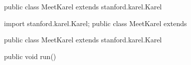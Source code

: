 \begin{sloppypar}
\begin{lstcodesimple}[language = Java, float=hb]
    public class MeetKarel extends stanford.karel.Karel{
            
    }
\end{lstcodesimple}

\begin{lstcodesimple}[language = Java, float]
    import stanford.karel.Karel;
    public class MeetKarel extends {
            
    }
\end{lstcodesimple}

\begin{lstcodesimple}[language = Java, float]
    public class MeetKarel extends stanford.karel.Karel{
            public void run(){

            }            
    }
\end{lstcodesimple}

\end{sloppypar}

